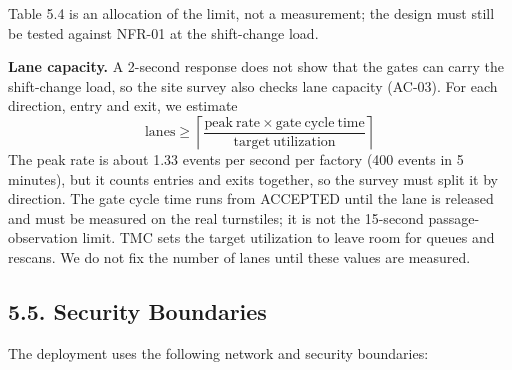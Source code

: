Table 5.4 is an allocation of the limit, not a measurement; the design must still be tested against NFR-01 at the shift-change load.

\textbf{Lane capacity.} A 2-second response does not show that the gates can carry the shift-change load, so the site survey also checks lane capacity (AC-03). For each direction, entry and exit, we estimate
\[ \mathrm{lanes} \geq \left\lceil \frac{\mathrm{peak\ rate} \times \mathrm{gate\ cycle\ time}}{\mathrm{target\ utilization}} \right\rceil \]
The peak rate is about 1.33 events per second per factory (400 events in 5 minutes), but it counts entries and exits together, so the survey must split it by direction. The gate cycle time runs from ACCEPTED until the lane is released and must be measured on the real turnstiles; it is not the 15-second passage-observation limit. TMC sets the target utilization to leave room for queues and rescans. We do not fix the number of lanes until these values are measured.

\subsection*{5.5. Security Boundaries}

{}


The deployment uses the following network and security boundaries:


